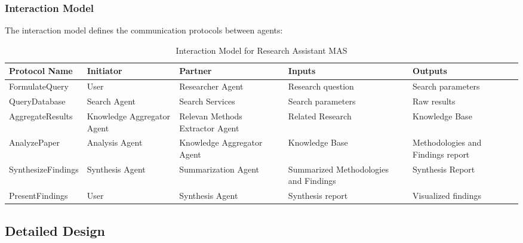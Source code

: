\documentclass[11pt,a4paper]{article}
\begin{document}
\subsubsection{Interaction Model}
The interaction model defines the communication protocols between agents:

\begin{table}[H]
    \centering
    \begin{tabular}{|p{3cm}|p{2.5cm}|p{2.5cm}|p{3cm}|p{3cm}|}
    \hline
    \textbf{Protocol Name} & \textbf{Initiator} & \textbf{Partner} & \textbf{Inputs} & \textbf{Outputs} \\
    \hline
    FormulateQuery & User & Researcher Agent & Research question & Search parameters \\
    \hline
    QueryDatabase & Search Agent & Search Services & Search parameters & Raw results \\
    \hline
    AggregateResults & Knowledge Aggregator Agent & Relevan Methods Extractor Agent & Related Research & Knowledge Base \\
    \hline
    AnalyzePaper & Analysis Agent & Knowledge Aggregator Agent & Knowledge Base &  Methodologies and Findings report \\
    \hline
    SynthesizeFindings & Synthesis Agent & Summarization Agent & Summarized Methodologies and Findings & Synthesis Report \\
    \hline
    PresentFindings & User & Synthesis Agent & Synthesis report & Visualized findings \\
    \hline
    \end{tabular}
    \caption{Interaction Model for Research Assistant MAS}
    \label{tab:interaction-model}
\end{table}



\subsection{Detailed Design}
\end{document}
